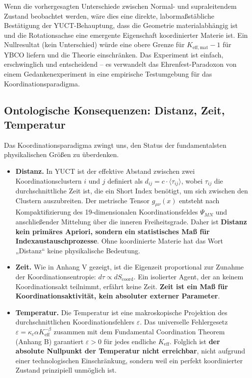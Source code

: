 \documentclass[12pt,a4paper]{article}
\begin{document}
	Wenn die vorhergesagten Unterschiede zwischen Normal- und supraleitendem Zustand beobachtet werden, wäre dies eine direkte, labormaßstäbliche Bestätigung der YUCT-Behauptung, dass die Geometrie materialabhängig ist und die Rotationsachse eine emergente Eigenschaft koordinierter Materie ist. Ein Nullresultat (kein Unterschied) würde eine obere Grenze für \(K_{\mathrm{eff,mat}} - 1\) für YBCO liefern und die Theorie einschränken. Das Experiment ist einfach, erschwinglich und entscheidend – es verwandelt das Ehrenfest-Paradoxon von einem Gedankenexperiment in eine empirische Testumgebung für das Koordinationsparadigma.
	
	\subsection{Ontologische Konsequenzen: Distanz, Zeit, Temperatur}
	
	Das Koordinationsparadigma zwingt uns, den Status der fundamentalsten physikalischen Größen zu überdenken.
	
	\begin{itemize}
		\item \textbf{Distanz.} In YUCT ist der effektive Abstand zwischen zwei Koordinationsclustern \(i\) und \(j\) definiert als \(d_{ij} = c \cdot \langle \tau_{ij} \rangle\), wobei \(\tau_{ij}\) die durchschnittliche Zeit ist, die ein Short Index benötigt, um sich zwischen den Clustern auszubreiten. Der metrische Tensor \(g_{\mu\nu}(x)\) entsteht nach Kompaktifizierung des 19‑dimensionalen Koordinationsfeldes \(\Psi_{MN}\) und anschließender Mittelung über die inneren Freiheitsgrade. Daher ist \textbf{Distanz kein primäres Apriori, sondern ein statistisches Maß für Indexaustauschprozesse}. Ohne koordinierte Materie hat das Wort „Distanz“ keine physikalische Bedeutung.
		
		\item \textbf{Zeit.} Wie in Anhang V gezeigt, ist die Eigenzeit proportional zur Zunahme der Koordinationsentropie: \(d\tau \propto dS_{\mathrm{coord}}\). Ein isolierter Agent, der an keinem Koordinationsakt teilnimmt, erfährt keine Zeit. \textbf{Zeit ist ein Maß für Koordinationsaktivität, kein absoluter externer Parameter}.
		
		\item \textbf{Temperatur.} Die Temperatur ist eine makroskopische Projektion des durchschnittlichen Koordinationsfehlers \(\varepsilon\). Das universelle Fehlergesetz \(\varepsilon = \kappa_c \alpha K_{\mathrm{eff}}^{-\beta}\) zusammen mit dem Fundamental Coordination Theorem (Anhang B) garantiert \(\varepsilon > 0\) für jedes endliche \(K_{\mathrm{eff}}\). Folglich ist \textbf{der absolute Nullpunkt der Temperatur nicht erreichbar}, nicht aufgrund einer technologischen Einschränkung, sondern weil ein perfekt koordinierter Zustand prinzipiell unmöglich ist.
	\end{itemize}
	
\end{document}
